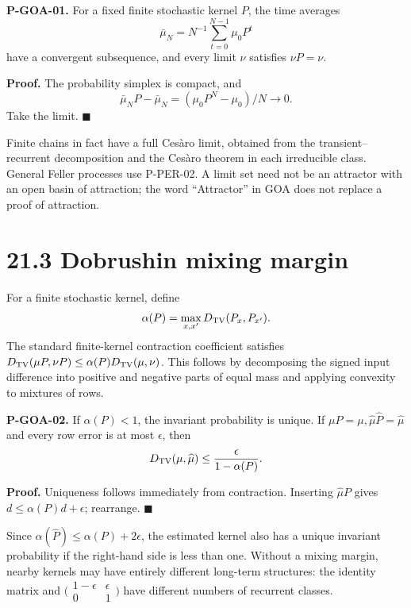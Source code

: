\documentclass[
  english,
  11pt,
  oneside]{book}
\begin{document}
\hypertarget{p-goa-01}{}\label{p-goa-01}

\textbf{P-GOA-01.} For a fixed finite stochastic kernel \(P\), the time averages \[\bar\mu_N=N^{-1}\sum_{t=0}^{N-1}\mu_0P^t\] have a convergent subsequence, and every limit \(\nu\) satisfies \(\nu P=\nu\).

\textbf{Proof.} The probability simplex is compact, and \[\bar\mu_NP-\bar\mu_N=(\mu_0P^N-\mu_0)/N\to0.\] Take the limit. \(\blacksquare\)

Finite chains in fact have a full Cesàro limit, obtained from the transient--recurrent decomposition and the Cesàro theorem in each irreducible class. General Feller processes use P-PER-02. A limit set need not be an attractor with an open basin of attraction; the word ``Attractor'' in GOA does not replace a proof of attraction.

\section{21.3 Dobrushin mixing margin}\label{dobrushin-mixing-margin}

For a finite stochastic kernel, define \[\alpha(P)=\max_{x,x'}D_{\rm TV}(P_x,P_{x'}).\] The standard finite-kernel contraction coefficient satisfies \(D_{\rm TV}(\mu P,\nu P)\le\alpha(P)D_{\rm TV}(\mu,\nu)\). This follows by decomposing the signed input difference into positive and negative parts of equal mass and applying convexity to mixtures of rows.

\hypertarget{p-goa-02}{}\label{p-goa-02}

\textbf{P-GOA-02.} If \(\alpha(P)<1\), the invariant probability is unique. If \(\mu P=\mu,\widehat\mu\widehat P=\widehat\mu\) and every row error is at most \(\epsilon\), then \[D_{\rm TV}(\mu,\widehat\mu)\le\frac{\epsilon}{1-\alpha(P)}.\]

\textbf{Proof.} Uniqueness follows immediately from contraction. Inserting \(\widehat\mu P\) gives \(d\le\alpha(P)d+\epsilon\); rearrange. \(\blacksquare\)

Since \(\alpha(\widehat P)\le\alpha(P)+2\epsilon\), the estimated kernel also has a unique invariant probability if the right-hand side is less than one. Without a mixing margin, nearby kernels may have entirely different long-term structures: the identity matrix and \(\bigl(\begin{smallmatrix}1-\epsilon&\epsilon\\0&1\end{smallmatrix}\bigr)\) have different numbers of recurrent classes.
\end{document}

